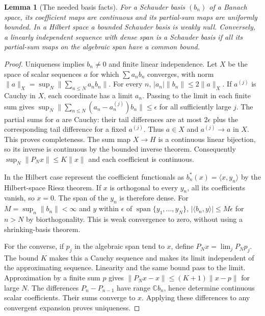 \documentclass[reqno,a4paper,12pt]{amsart}
\newtheorem{lemma}[theorem]{Lemma}
\newcommand{\C}{\mathbb C}
\newcommand{\spn}{\operatorname{span}}
\newcommand{\ip}[2]{\langle #1,#2\rangle}
\begin{document}
\begin{lemma}[The needed basis facts]\label{basisfacts}
For a Schauder basis $(b_n)$ of a Banach space, its coefficient maps are
continuous and its partial-sum maps are uniformly bounded.
In a Hilbert space a bounded Schauder basis is weakly null.
Conversely, a linearly independent sequence with dense span is a Schauder
basis if all its partial-sum maps on the algebraic span have a common bound.
\end{lemma}
\begin{proof}
Uniqueness implies $b_n\ne0$ and finite linear independence. Let $X$ be the
space of scalar sequences $a$ for which $\sum a_nb_n$ converges, with norm
$\|a\|_X=\sup_N\|\sum_{n\le N}a_nb_n\|$.
For every $n$, $|a_n|\|b_n\|\le2\|a\|_X$.
If $a^{(j)}$ is Cauchy in $X$, each coordinate has a limit $a_n$.
Passing to the limit in each finite sum gives
$\sup_N\|\sum_{n\le N}(a_n-a_n^{(j)})b_n\|\le\epsilon$
for all sufficiently large $j$. The partial sums for $a$ are Cauchy:
their tail differences are at most $2\epsilon$ plus the corresponding
tail difference for a fixed $a^{(j)}$. Thus $a\in X$ and
$a^{(j)}\to a$ in $X$. This proves completeness.
The sum map $X\to H$ is a continuous linear bijection, so its inverse
is continuous by the bounded inverse theorem. Consequently
$\sup_N\|P_Nx\|\le K\|x\|$ and each coefficient is continuous.

In the Hilbert case represent the coefficient functionals as
$b_n^*(x)=\ip{x}{y_n}$ by the Hilbert-space Riesz theorem.
If $x$ is orthogonal to every $y_n$, all its coefficients vanish, so $x=0$.
The span of the $y_n$ is therefore dense. For $M=\sup_n\|b_n\|<\infty$
and $y$ within $\epsilon$ of $\spn\{y_1,\ldots,y_N\}$,
$|\ip{b_n}{y}|\le M\epsilon$ for $n>N$ by biorthogonality.
This is weak convergence to zero, without using a shrinking-basis theorem.

For the converse, if $p_j$ in the algebraic span tend to $x$, define
$P_Nx=\lim_jP_Np_j$. The bound $K$ makes this a Cauchy sequence and makes
its limit independent of the approximating sequence. Linearity and the
same bound pass to the limit.
Approximation by a finite sum $p$ gives
$\|P_Nx-x\|\le(K+1)\|x-p\|$ for large $N$.
The differences $P_n-P_{n-1}$ have range $\C b_n$, hence determine
continuous scalar coefficients. Their sums converge to $x$.
Applying these differences to any convergent expansion proves uniqueness.
\end{proof}
\end{document}
